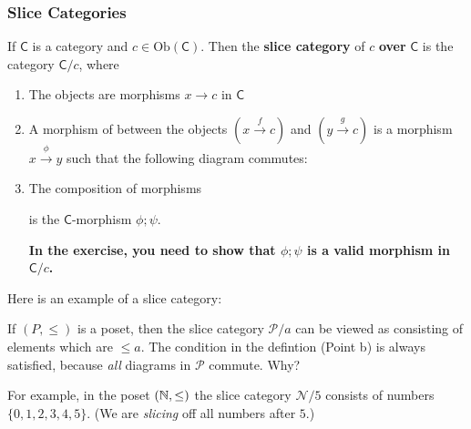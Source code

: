\subsubsection{Slice Categories}
If $\textsf{C}$ is a category and $c \in \text{Ob}(\textsf{C})$.
Then the \textbf{slice category} of $c$ \textbf{over} $\textsf{C}$ is the category $\textsf{C}/c$, where
\begin{enumerate}
  \item The objects are morphisms $x \to c$ in $\textsf{C}$
  \item A morphism of between the objects $(x \stackrel{f}{\to}c)$ and $(y \stackrel{g}{\to}c)$ is a morphism $x \stackrel{\phi}{\to} y$ such that the following diagram commutes:
    \begin{center}
    \end{center}
  \item The composition of morphisms
    \begin{center}
    \end{center}
    is the $\textsf{C}$-morphism $\phi;\psi$.

    \textbf{In the exercise, you need to show that $\phi;\psi$ is a valid morphism in $\textsf{C}/c$.}
\end{enumerate}


Here is an example of a slice category:

If $(P,\leq)$ is a poset, then the slice category $\mathcal{P}/a$ can be viewed as consisting of elements which are $\leq a$.
The condition in the defintion (Point b) is always satisfied, because \emph{all} diagrams in $\mathcal{P}$ commute. Why?
    
For example, in the poset $(\mathbb{N},\leq)$ the slice category $\mathcal{N}/5$ consists of numbers $\{0,1,2,3,4,5\}$. (We are \emph{slicing} off all numbers after $5$.)

